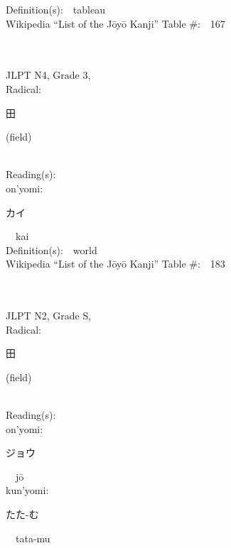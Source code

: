 \begin{multicols}{2}
Definition(s):\ \ tableau \\
Wikipedia ``List of the J\=oy\=o Kanji'' Table \#:\ \ 167 \\
\ \ \\
{\fontsize{34pt}{40pt}  }\ \ \\  %
{JLPT N4, Grade 3, \\Radical:\ \ {\begin{CJK}{UTF8}{min} 田 \end{CJK}} (field) } \\
Reading(s):\ \ \\
{\hspace*{1em}}on'yomi:\ \ \\
{\hspace*{2em}}{\begin{CJK}{UTF8}{min} カイ \end{CJK}}\ \ kai\ \ \\
Definition(s):\ \ world \\
Wikipedia ``List of the J\=oy\=o Kanji'' Table \#:\ \ 183 \\
\ \ \\
{\fontsize{34pt}{40pt}  }\ \ \\  %
{JLPT N2, Grade S, \\Radical:\ \ {\begin{CJK}{UTF8}{min} 田 \end{CJK}} (field) } \\
Reading(s):\ \ \\
{\hspace*{1em}}on'yomi:\ \ \\
{\hspace*{2em}}{\begin{CJK}{UTF8}{min} ジョウ \end{CJK}}\ \ j\=o\ \ \\
{\hspace*{1em}}kun'yomi:\ \ \\
{\hspace*{2em}}{\begin{CJK}{UTF8}{min} たた-む \end{CJK}}\ \ tata-mu\ \ \\

\end{multicols}

